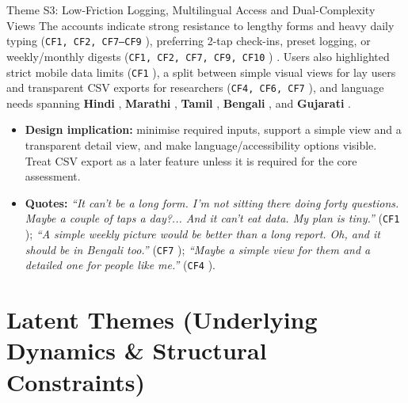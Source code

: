 \documentclass[12pt, a4paper]{article}
\begin{document}
\begin{semanticcard}{Theme S3: Low-Friction Logging, Multilingual Access and Dual-Complexity Views}
The accounts indicate strong resistance to lengthy forms and heavy daily typing (\texttt{CF1, CF2, CF7--CF9} \cite{cf1, cf2, cf7, cf8, cf9}), preferring 2-tap check-ins, preset logging, or weekly/monthly digests (\texttt{CF1, CF2, CF7, CF9, CF10} \cite{cf1, cf2, cf7, cf9, cf10}) \cite{malan2020, hoffmann2024}. Users also highlighted strict mobile data limits (\texttt{CF1} \cite{cf1}), a split between simple visual views for lay users and transparent CSV exports for researchers (\texttt{CF4, CF6, CF7} \cite{cf4, cf6, cf7}), and language needs spanning \textbf{Hindi} \cite{cf1, cf3, cf4, cf8}, \textbf{Marathi} \cite{cf1}, \textbf{Tamil} \cite{cf4}, \textbf{Bengali} \cite{cf7}, and \textbf{Gujarati} \cite{cf10}.
\begin{itemize}
    \item \textbf{Design implication:} minimise required inputs, support a simple view and a transparent detail view, and make language/accessibility options visible. Treat CSV export as a later feature unless it is required for the core assessment.
    \item \textbf{Quotes:} \textit{``It can't be a long form. I'm not sitting there doing forty questions. Maybe a couple of taps a day?... And it can't eat data. My plan is tiny.''} (\texttt{CF1} \cite{cf1}); \textit{``A simple weekly picture would be better than a long report. Oh, and it should be in Bengali too.''} (\texttt{CF7} \cite{cf7}); \textit{``Maybe a simple view for them and a detailed one for people like me.''} (\texttt{CF4} \cite{cf4}).
\end{itemize}
\end{semanticcard}

\section{Latent Themes (Underlying Dynamics \& Structural Constraints)}
\end{document}
